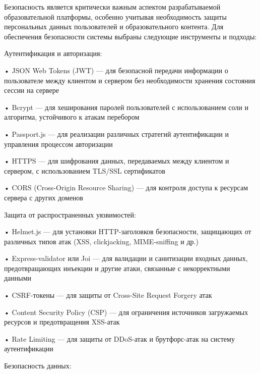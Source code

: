 \subtitlespace

{\gostFont

  \par \redline Безопасность является критически важным аспектом разрабатываемой образовательной платформы, особенно учитывая необходимость защиты персональных данных пользователей и образовательного контента. Для обеспечения безопасности системы выбраны следующие инструменты и подходы:

  \par \redline Аутентификация и авторизация:

  \par \redline • JSON Web Tokens (JWT) — для безопасной передачи информации о пользователе между клиентом и сервером без необходимости хранения состояния сессии на сервере
  \par \redline • Bcrypt — для хеширования паролей пользователей с использованием соли и алгоритма, устойчивого к атакам перебором
  \par \redline • Passport.js — для реализации различных стратегий аутентификации и управления процессом авторизации
  \par \redline • HTTPS — для шифрования данных, передаваемых между клиентом и сервером, с использованием TLS/SSL сертификатов
  \par \redline • CORS (Cross-Origin Resource Sharing) — для контроля доступа к ресурсам сервера с других доменов

  \par \redline Защита от распространенных уязвимостей:

  \par \redline • Helmet.js — для установки HTTP-заголовков безопасности, защищающих от различных типов атак (XSS, clickjacking, MIME-sniffing и др.)
  \par \redline • Express-validator или Joi — для валидации и санитизации входных данных, предотвращающих инъекции и другие атаки, связанные с некорректными данными
  \par \redline • CSRF-токены — для защиты от Cross-Site Request Forgery атак
  \par \redline • Content Security Policy (CSP) — для ограничения источников загружаемых ресурсов и предотвращения XSS-атак
  \par \redline • Rate Limiting — для защиты от DDoS-атак и брутфорс-атак на систему аутентификации

  \par \redline Безопасность данных:

}
